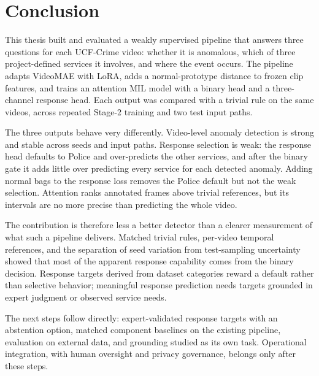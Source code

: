 \chapter{Conclusion}
\label{chap:conclusion}

This thesis built and evaluated a weakly supervised pipeline that answers three
questions for each UCF-Crime video: whether it is anomalous, which of three
project-defined services it involves, and where the event occurs. The pipeline
adapts VideoMAE with LoRA, adds a normal-prototype distance to frozen clip
features, and trains an attention MIL model with a binary head and a
three-channel response head. Each output was compared with a trivial rule on the
same videos, across repeated Stage-2 training and two test input paths.

The three outputs behave very differently. Video-level anomaly detection is
strong and stable across seeds and input paths. Response selection is weak: the
response head defaults to Police and over-predicts the other services, and after
the binary gate it adds little over predicting every service for each detected
anomaly. Adding normal bags to the response loss removes the Police default but
not the weak selection. Attention ranks annotated frames above trivial
references, but its intervals are no more precise than predicting the whole
video.

The contribution is therefore less a better detector than a clearer measurement
of what such a pipeline delivers. Matched trivial rules, per-video temporal
references, and the separation of seed variation from test-sampling uncertainty
showed that most of the apparent response capability comes from the binary
decision. Response targets derived from dataset categories reward a default
rather than selective behavior; meaningful response prediction needs targets
grounded in expert judgment or observed service needs.

The next steps follow directly: expert-validated response targets with an
abstention option, matched component baselines on the existing pipeline,
evaluation on external data, and grounding studied as its own task. Operational
integration, with human oversight and privacy governance, belongs only after
these steps.
